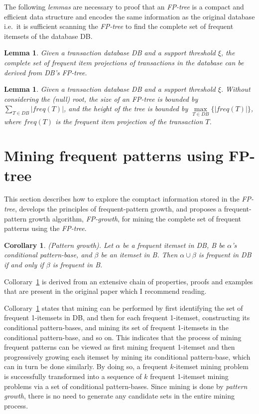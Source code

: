 \documentclass[12pt, a4paper]{article}
\newtheorem{corollary}{Corollary}[theorem]
\newtheorem{lemma}[theorem]{Lemma}
\begin{document}
The following \textit{lemmas} are necessary to proof that an \textit{FP-tree} is a compact and efficient data structure and encodes the same information as the original database i.e.\ it is sufficient scanning the \textit{FP-tree} to find the complete set of frequent itemsets of the database DB.

\begin{lemma}
  Given a transaction database DB and a support threshold $\xi$, the complete set of frequent item projections of transactions in the database can be derived from DB's FP-tree.
\end{lemma}

\begin{lemma}
  Given a transaction database DB and a support threshold $\xi$. Without considering the (null) root, the size of an FP-tree is bounded by $\sum_{T \in DB} |freq(T)|$, and the height of the tree is bounded by $\underset{T \in DB}{\max} \{|freq(T)|\}$, where $freq(T)$ is the frequent item projection of the transaction $T$.
\end{lemma}

\section{Mining frequent patterns using FP-tree}

This section describes how to explore the comptact information stored in the \textit{FP-tree}, develops the principles of frequent-pattern growth, and proposes a frequent-pattern growth algorithm, \textit{FP-growth}, for mining the complete set of frequent patterns using the \textit{FP-tree}.

\begin{corollary}\label{cor:pattern-growth}
  (Pattern growth). \quad Let $\alpha$ be a frequent itemset in DB, B be $\alpha$'s conditional pattern-base, and $\beta$ be an itemset in B. Then $\alpha \cup \beta$ is frequent in DB if and only if $\beta$ is frequent in B.
\end{corollary}

Collorary~\ref{cor:pattern-growth} is derived from an extensive chain of properties, proofs and examples that are present in the original paper which I recommend reading.

Collorary~\ref{cor:pattern-growth} states that mining can be performed by first identifying the set of frequent 1-itemsets in DB, and then for each frequent 1-itemset, constructing its conditional pattern-bases, and mining its set of frequent 1-itemsets in the conditional pattern-base, and so on. This indicates that the process of mining frequent patterns can be viewed as first mining frequent 1-itemset and then progressively growing each itemset by mining its conditional pattern-base, which can in turn be done similarly. By doing so, a frequent $k$-itemset mining problem is successfully transformed into a sequence of $k$ frequent 1-itemset mining problems via a set of conditional pattern-bases. Since mining is done by \textit{pattern growth}, there is no need to generate any candidate sets in the entire mining process.
\end{document}
